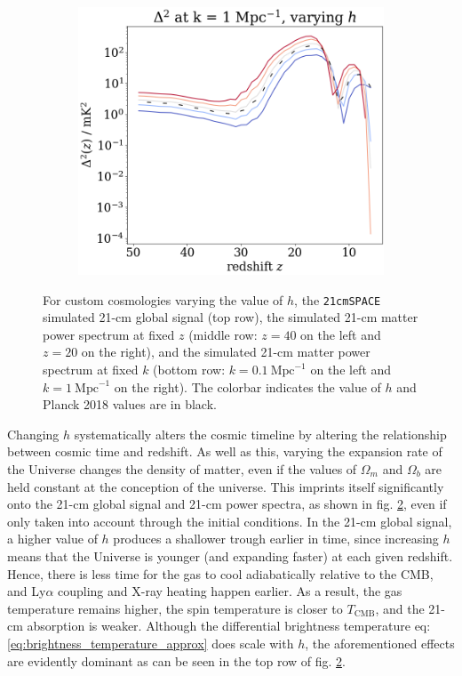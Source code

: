 \documentclass[floats,floatfix,showpacs,amssymb,prd,superscriptaddress,nofootinbib]{revtex4-2} %
\newcommand{\code}{\texttt}
\begin{document}
\begin{figure}[H]
\begin{subfigure}[b]{0.45\textwidth}
     \end{subfigure}
     \hfill
     \begin{subfigure}[b]{0.45\textwidth}
         \centering
         \includegraphics[width=\textwidth]{images/simulation_results/power_spectrum_fixed_k_1_h.png}
         \label{fig:power_spectrum_fixed_k_1_h}
     \end{subfigure}
        \caption{For custom cosmologies varying the value of $h$, the \code{21cmSPACE} simulated 21-cm global signal (top row), the simulated 21-cm matter power spectrum at fixed $z$ (middle row: $z = 40$ on the left and $z = 20$ on the right), and the simulated 21-cm matter power spectrum at fixed $k$ (bottom row: $k = 0.1 ~\text{Mpc}^{-1}$ on the left and $k = 1 ~\text{Mpc}^{-1}$ on the right). The colorbar indicates the value of $h$ and Planck 2018 values are in black.}
        \label{fig:simulation_results_h}
\end{figure}

Changing $h$ systematically alters the cosmic timeline by altering the relationship between cosmic time and redshift. As well as this, varying the expansion rate of the Universe changes the density of matter, even if the values of $\Omega_m$ and $\Omega_b$ are held constant at the conception of the universe. This imprints itself significantly onto the 21-cm global signal and 21-cm power spectra, as shown in fig. \ref{fig:simulation_results_h}, even if only taken into account through the initial conditions. In the 21-cm global signal, a higher value of $h$ produces a shallower trough earlier in time, since increasing $h$ means that the Universe is younger (and expanding faster) at each given redshift. Hence, there is less time for the gas to cool adiabatically relative to the CMB, and Ly$\alpha$ coupling and X-ray heating happen earlier. As a result, the gas temperature remains higher, the spin temperature is closer to $T_{\text{CMB}}$, and the 21-cm absorption is weaker. Although the differential brightness temperature eq: \ref{eq:brightness_temperature_approx} does scale with $h$, the aforementioned effects are evidently dominant as can be seen in the top row of fig. \ref{fig:simulation_results_h}. 
\end{document}
